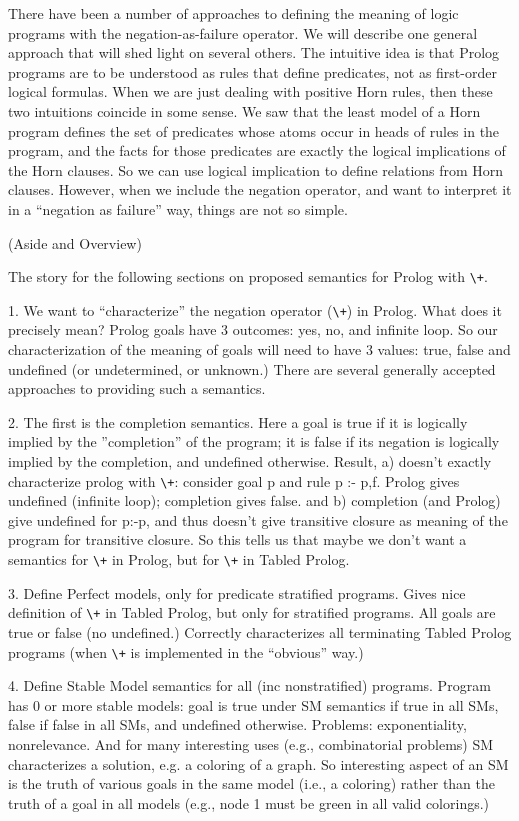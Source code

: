 There have been a number of approaches to defining the meaning of
logic programs with the negation-as-failure operator.  We will
describe one general approach that will shed light on several others.
The intuitive idea is that Prolog programs are to be understood as
rules that define predicates, not as first-order logical formulas.
When we are just dealing with positive Horn rules, then these two
intuitions coincide in some sense.  We saw that the least model of a
Horn program defines the set of predicates whose atoms occur in heads
of rules in the program, and the facts for those predicates are
exactly the logical implications of the Horn clauses.  So we can use
logical implication to define relations from Horn clauses.  However,
when we include the negation operator, and want to interpret it in a
``negation as failure'' way, things are not so simple.

(Aside and Overview)

The story for the following sections on proposed semantics for Prolog
with \verb|\+|.

1. We want to ``characterize'' the negation operator (\verb|\+|) in
Prolog.  What does it precisely mean?  Prolog goals have 3 outcomes:
yes, no, and infinite loop.  So our characterization of the meaning of
goals will need to have 3 values: true, false and undefined (or
undetermined, or unknown.)  There are several generally accepted
approaches to providing such a semantics.

2. The first is the completion semantics.  Here a goal is
true if it is logically implied by the ''completion'' of the program;
it is false if its negation is logically implied by the completion,
and undefined otherwise.  Result, a) doesn't exactly characterize
prolog with \verb|\+|: consider goal p and rule p :- p,f.  Prolog
gives undefined (infinite loop); completion gives false. and b)
completion (and Prolog) give undefined for p:-p, and thus doesn't give
transitive closure as meaning of the program for transitive closure.
So this tells us that maybe we don't want a semantics for \verb|\+| in
Prolog, but for \verb|\+| in Tabled Prolog.

3. Define Perfect models, only for predicate stratified programs.
Gives nice definition of \verb|\+| in Tabled Prolog, but only for stratified
programs.  All goals are true or false (no undefined.)  Correctly
characterizes all terminating Tabled Prolog programs (when \verb|\+| is
implemented in the ``obvious'' way.)

4. Define Stable Model semantics for all (inc nonstratified) programs.
Program has 0 or more stable models: goal is true under SM semantics
if true in all SMs, false if false in all SMs, and undefined
otherwise.  Problems: exponentiality, nonrelevance.  And for many
interesting uses (e.g., combinatorial problems) SM characterizes a
solution, e.g. a coloring of a graph.  So interesting aspect of an SM
is the truth of various goals in the same model (i.e., a coloring)
rather than the truth of a goal in all models (e.g., node 1 must be
green in all valid colorings.)

